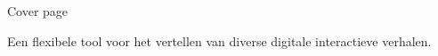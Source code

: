
\thispagestyle{empty}

Cover page

Een flexibele tool voor het vertellen van diverse digitale interactieve verhalen.
\afterpage{\blankpage}